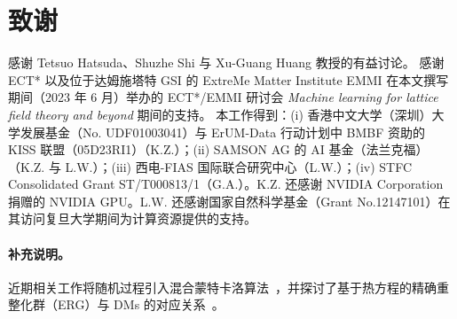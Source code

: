 \section*{致谢}

感谢 Tetsuo Hatsuda、Shuzhe Shi 与 Xu-Guang Huang 教授的有益讨论。
感谢 ECT* 以及位于达姆施塔特 GSI 的 ExtreMe Matter Institute EMMI 在本文撰写期间（2023 年 6 月）举办的 ECT*/EMMI 研讨会 {\em Machine learning for lattice field theory and beyond} 期间的支持。
本工作得到：(i) 香港中文大学（深圳）大学发展基金（No. UDF01003041）与 ErUM-Data 行动计划中 BMBF 资助的 KISS 联盟（05D23RI1）（K.Z.）；(ii) SAMSON AG 的 AI 基金（法兰克福）（K.Z. 与 L.W.）；(iii) 西电-FIAS 国际联合研究中心（L.W.）；(iv) STFC Consolidated Grant ST/T000813/1（G.A.）。K.Z. 还感谢 NVIDIA Corporation 捐赠的 NVIDIA GPU。L.W. 还感谢国家自然科学基金（Grant No.12147101）在其访问复旦大学期间为计算资源提供的支持。

\paragraph{补充说明。}近期相关工作将随机过程引入混合蒙特卡洛算法~\cite{Robnik:2023pgt}，并探讨了基于热方程的精确重整化群（ERG）与 DMs 的对应关系~\cite{Cotler:2023lem}。
